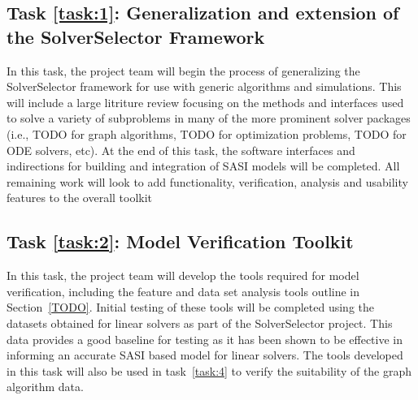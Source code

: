 %

\setcounter{taskCount}{0}

\label{task:1}
\subsection{Task \ref{task:1}: Generalization and extension of the SolverSelector Framework}
In this task, the project team will begin the process of generalizing the SolverSelector framework for 
use with generic algorithms and simulations. This will include a large litriture review focusing on the methods 
and interfaces used to solve a variety of subproblems in many of the more prominent solver packages (i.e., TODO for 
graph algorithms, TODO for optimization problems, TODO for ODE solvers, etc). At the end of this task, the software interfaces
and indirections for building and integration of SASI models will be completed. All remaining work will look to add functionality, verification, analysis and usability features to the overall toolkit


\label{task:2}
\subsection{Task \ref{task:2}: Model Verification Toolkit }
In this task, the project team will develop the tools required for model verification, including the feature and data set analysis tools outline in Section~\ref{TODO}. Initial testing of these tools will be completed using the datasets obtained for linear solvers as part of the SolverSelector 
project. This data provides a good baseline for testing as it has been shown to be effective in informing an accurate SASI based model for linear solvers. The tools developed in this task will also be used in task~\ref{task:4} to verify the suitability of the graph algorithm data. 


